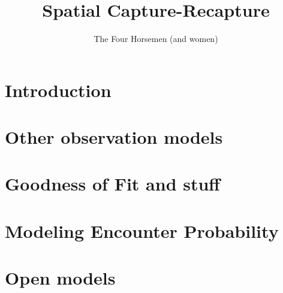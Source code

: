 \documentclass{book}
\begin{document}
\title{ Spatial Capture-Recapture  }
\subtitle{
}
\author{The Four Horsemen (and women) }

\address{
USGS Patuxent Wildlife Research Center \\
North Carolina State University
}

\maketitle

\newpage

\setcounter{tocdepth}{2}
\tableofcontents

\chapter{Introduction}
\label{chapt.intro}







\chapter{Other observation models}
\label{chapt.poisson}

%





\chapter{Goodness of Fit and stuff}
\label{chapt.gof}

\chapter{Modeling Encounter Probability}
\label{chapt.covariates}






\chapter{Open models}
\label{chapt.open}














\end{document}
